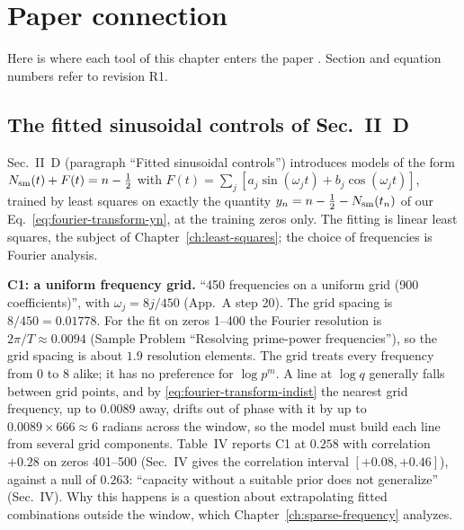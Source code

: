 \section{Paper connection}\label{sec:fourier-transform-paper}

Here is where each tool of this chapter enters the paper \cite{soniR1}. Section and equation numbers refer to revision R1.

\subsection{The fitted sinusoidal controls of Sec.~II~D}

Sec.~II~D (paragraph ``Fitted sinusoidal controls'') introduces models of the form $N_{\rm sm}(t)+F(t)=n-\frac12$ with $F(t)=\sum_j[a_j\sin(\omega_jt)+b_j\cos(\omega_jt)]$, trained by least squares on exactly the quantity $y_n=n-\frac12-N_{\rm sm}(t_n)$ of our Eq.~\eqref{eq:fourier-transform-yn}, at the training zeros only. The fitting is linear least squares, the subject of Chapter~\ref{ch:least-squares}; the choice of frequencies is Fourier analysis.

\textbf{C1: a uniform frequency grid.} ``450 frequencies on a uniform grid (900 coefficients)'', with $\omega_j=8j/450$ (App.~A step 20). The grid spacing is $8/450=0.01778$. For the fit on zeros 1--400 the Fourier resolution is $2\pi/T\approx0.0094$ (Sample Problem ``Resolving prime-power frequencies''), so the grid spacing is about $1.9$ resolution elements. The grid treats every frequency from $0$ to $8$ alike; it has no preference for $\log p^m$. A line at $\log q$ generally falls between grid points, and by \eqref{eq:fourier-transform-indist} the nearest grid frequency, up to $0.0089$ away, drifts out of phase with it by up to $0.0089\times666\approx6$ radians across the window, so the model must build each line from several grid components. Table~IV reports C1 at $0.258$ with correlation $+0.28$ on zeros 401--500 (Sec.~IV gives the correlation interval $[+0.08,+0.46]$), against a null of $0.263$: ``capacity without a suitable prior does not generalize'' (Sec.~IV). Why this happens is a question about extrapolating fitted combinations outside the window, which Chapter~\ref{ch:sparse-frequency} analyzes.

